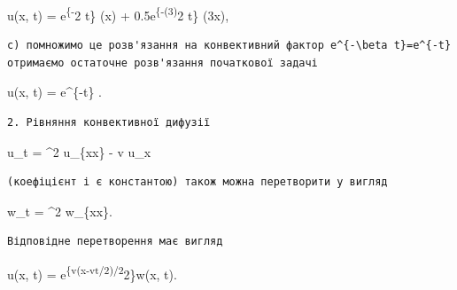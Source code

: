 \documentclass[
  ukrainian,
]{article}
\begin{document}
u(x, t) = e\textsuperscript{\{-\pi}2 t\} \sin(\pi x) +
0.5e\textsuperscript{\{-(3\pi)}2 t\} \sin(3\pi x),

\begin{verbatim}
c) помножимо це розв'язання на конвективний фактор e^{-\beta t}=e^{-t}отримаємо остаточне розв'язання початкової задачі
\end{verbatim}

u(x, t) = e\^{}\{-t\}
.

\begin{verbatim}
2. Рівняння конвективної дифузії
\end{verbatim}

u\_t = \alpha\^{}2 u\_\{xx\} - v u\_x

\begin{verbatim}
(коефіцієнт і є константою) також можна перетворити у вигляд
\end{verbatim}

w\_t = \alpha\^{}2 w\_\{xx\}.

\begin{verbatim}
Відповідне перетворення має вигляд
\end{verbatim}

u(x, t) = e\textsuperscript{\{v(x-vt/2)/2\alpha}2\}w(x, t).
\end{document}
